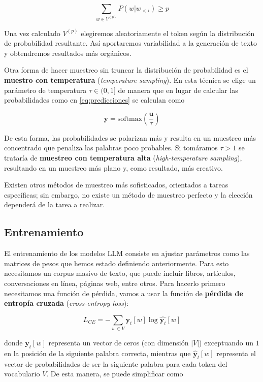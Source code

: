 \documentclass[12pt,twoside]{article}
\newcommand{\abs}[1]{\ensuremath{|#1|}}
\begin{document}
\begin{equation}
    \sum_{w\in V^{(p)}}P(w|w_{<i})\geq p
\end{equation}

Una vez calculado $V^{(p)}$ elegiremos aleatoriamente el token según la distribución de probabilidad resultante. Así aportaremos variabilidad a la generación de texto y obtendremos resultados más orgánicos.

Otra forma de hacer muestreo sin truncar la distribución de probabilidad es el \textbf{muestro con temperatura} (\textit{temperature sampling}). En esta técnica se elige un parámetro de temperatura $\tau\in(0,1]$ de manera que en lugar de calcular las probabilidades como en \eqref{eq:predicciones} se calculan como

\begin{equation}
    \mathbf{y}=\text{softmax}(\frac{\mathbf{u}}{\tau})
\end{equation}

De esta forma, las probabilidades se polarizan más y resulta en un muestreo más concentrado que penaliza las palabras poco probables. Si tomáramos $\tau>1$ se trataría de \textbf{muestreo con temperatura alta} (\textit{high-temperature sampling}), resultando en un muestreo más plano y, como resultado, más creativo.

Existen otros métodos de muestreo más sofisticados, orientados a tareas específicas; sin embargo, no existe un método de muestreo perfecto y la elección dependerá de la tarea a realizar.

\subsection{Entrenamiento}
El entrenamiento de los modelos LLM consiste en ajustar parámetros como las matrices de pesos que hemos estado definiendo anteriormente. Para esto necesitamos un corpus masivo de texto, que puede incluir libros, artículos, conversaciones en línea, páginas web, entre otros. Para hacerlo primero necesitamos una función de pérdida, vamos a usar la función de \textbf{pérdida de entropía cruzada} (\textit{cross-entropy loss}):

\begin{equation}
    L_{CE}=-\sum_{w\in V}\mathbf{y}_t[w]\log \hat{\mathbf{y}_t}[w]
\end{equation}

donde $\mathbf{y}_t[w]$ representa un vector de ceros (con dimensión $\abs{V}$) exceptuando un $1$ en la posición de la siguiente palabra correcta, mientras que $\hat{\mathbf{y}}_t[w]$ representa el vector de probabilidades de ser la siguiente palabra para cada token del vocabulario $V$.
De esta manera, se puede simplificar como
\end{document}
